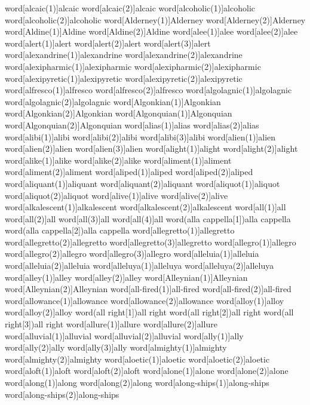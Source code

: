 word[alcaic(1)]{alcaic}
word[alcaic(2)]{alcaic}
word[alcoholic(1)]{alcoholic}
word[alcoholic(2)]{alcoholic}
word[Alderney(1)]{Alderney}
word[Alderney(2)]{Alderney}
word[Aldine(1)]{Aldine}
word[Aldine(2)]{Aldine}
word[alee(1)]{alee}
word[alee(2)]{alee}
word[alert(1)]{alert}
word[alert(2)]{alert}
word[alert(3)]{alert}
word[alexandrine(1)]{alexandrine}
word[alexandrine(2)]{alexandrine}
word[alexipharmic(1)]{alexipharmic}
word[alexipharmic(2)]{alexipharmic}
word[alexipyretic(1)]{alexipyretic}
word[alexipyretic(2)]{alexipyretic}
word[alfresco(1)]{alfresco}
word[alfresco(2)]{alfresco}
word[algolagnic(1)]{algolagnic}
word[algolagnic(2)]{algolagnic}
word[Algonkian(1)]{Algonkian}
word[Algonkian(2)]{Algonkian}
word[Algonquian(1)]{Algonquian}
word[Algonquian(2)]{Algonquian}
word[alias(1)]{alias}
word[alias(2)]{alias}
word[alibi(1)]{alibi}
word[alibi(2)]{alibi}
word[alibi(3)]{alibi}
word[alien(1)]{alien}
word[alien(2)]{alien}
word[alien(3)]{alien}
word[alight(1)]{alight}
word[alight(2)]{alight}
word[alike(1)]{alike}
word[alike(2)]{alike}
word[aliment(1)]{aliment}
word[aliment(2)]{aliment}
word[aliped(1)]{aliped}
word[aliped(2)]{aliped}
word[aliquant(1)]{aliquant}
word[aliquant(2)]{aliquant}
word[aliquot(1)]{aliquot}
word[aliquot(2)]{aliquot}
word[alive(1)]{alive}
word[alive(2)]{alive}
word[alkalescent(1)]{alkalescent}
word[alkalescent(2)]{alkalescent}
word[all(1)]{all}
word[all(2)]{all}
word[all(3)]{all}
word[all(4)]{all}
word(alla cappella[1]){alla cappella}
word(alla cappella[2]){alla cappella}
word[allegretto(1)]{allegretto}
word[allegretto(2)]{allegretto}
word[allegretto(3)]{allegretto}
word[allegro(1)]{allegro}
word[allegro(2)]{allegro}
word[allegro(3)]{allegro}
word[alleluia(1)]{alleluia}
word[alleluia(2)]{alleluia}
word[alleluya(1)]{alleluya}
word[alleluya(2)]{alleluya}
word[alley(1)]{alley}
word[alley(2)]{alley}
word[Alleynian(1)]{Alleynian}
word[Alleynian(2)]{Alleynian}
word[all-fired(1)]{all-fired}
word[all-fired(2)]{all-fired}
word[allowance(1)]{allowance}
word[allowance(2)]{allowance}
word[alloy(1)]{alloy}
word[alloy(2)]{alloy}
word(all right[1]){all right}
word(all right[2]){all right}
word(all right[3]){all right}
word[allure(1)]{allure}
word[allure(2)]{allure}
word[alluvial(1)]{alluvial}
word[alluvial(2)]{alluvial}
word[ally(1)]{ally}
word[ally(2)]{ally}
word[ally(3)]{ally}
word[almighty(1)]{almighty}
word[almighty(2)]{almighty}
word[aloetic(1)]{aloetic}
word[aloetic(2)]{aloetic}
word[aloft(1)]{aloft}
word[aloft(2)]{aloft}
word[alone(1)]{alone}
word[alone(2)]{alone}
word[along(1)]{along}
word[along(2)]{along}
word[along-ships(1)]{along-ships}
word[along-ships(2)]{along-ships}
